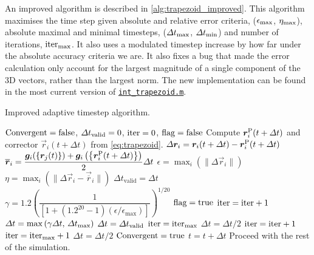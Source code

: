 An improved algorithm is described in \cref{alg:trapezoid_improved}. This algorithm maximises the time step given absolute and relative error criteria, ($\epsilon_{\textrm{max}}$, $\eta_{\textrm{max}}$), absolute maximal and minimal timesteps, ($\Delta t_{\textrm{max}}$, $\Delta t_{\textrm{min}}$) and number of iterations, $\textrm{iter}_{\textrm{max}}$. It also uses a modulated timestep increase by how far under the absolute accuracy criteria we are. It also fixes a bug that made the error calculation only account for the largest magnitude of a single component of the 3D vectors, rather than the largest norm. The new implementation can be found in the most current version of \href{https://github.com/TarletonGroup/EasyDD/blob/master/src/int_trapezoid.m}{\texttt{int\_trapezoid.m}}.
\begin{algorithm}
  \caption{Improved adaptive timestep algorithm.}
  \label{alg:trapezoid_improved}
  \begin{algorithmic}
    \State $\textrm{Convergent} = \textrm{false}$, $\Delta t_{\textrm{valid}} = 0$, $\textrm{iter} = 0$, $\textrm{flag} = \textrm{false}$
    \State Compute $\vec{r}_i^{\rvar{P}}(t + \Delta t)$ and corrector $\vec{r}_i(t + \Delta t)$ from \cref{eq:trapezoid}.
    \State $\Delta \vec{r}_i = \vec{r}_i(t + \Delta t) - \vec{r}_i^{\rvar{P}}(t + \Delta t)$
    \State $\vec{\overline{r}}_i = \dfrac{\vec{g}_i(\left\{\vec{r}_j(t)\right\}) + \vec{g}_i\left(\left\{\vec{r}_i^{\rvar{P}}(t + \Delta t)\right\}\right)}{2}\Delta t$
    \State $\epsilon = \max_i\left(\lVert \Delta \vec{r}_i \rVert \right)$
    \State $\eta = \max_i\left(\lVert \Delta \vec{r}_i - \vec{\overline{r}}_i \rVert\right)$
    \State $\Delta t_{\textrm{valid}} = \Delta t$
    \State $\gamma = 1.2\left(\dfrac{1}{\left[1 + (1.2^{20} - 1) (\epsilon / \epsilon_{\textrm{max}})\right]}\right)^{1/20}$
    \State $\textrm{flag} = \textrm{true}$
    \State $\textrm{iter} = \textrm{iter} + 1$
    \State $\Delta t = \max\left(\gamma \Delta t,\, \Delta t_{\textrm{max}}\right)$
    \State $\Delta t = \Delta t_{\textrm{valid}}$
    \State $\textrm{iter} = \textrm{iter}_{\textrm{max}}$
    \State $\Delta t = \Delta t / 2$
    \State $\textrm{iter} = \textrm{iter} + 1$
    \State $\textrm{iter} = \textrm{iter}_{\textrm{max}} + 1$
    \Else
    \State $\Delta t = \Delta t / 2$
    \EndIf
    \State $\textrm{Convergent} = \textrm{true}$
    \EndIf
    \EndWhile
    \State $t = t + \Delta t$
    \State Proceed with the rest of the simulation.
  \end{algorithmic}
\end{algorithm}

